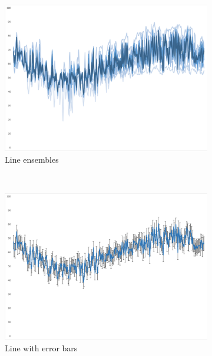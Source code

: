 \begin{figure}[t!]
	\centering
	\begin{subfigure}[t]{.3\columnwidth}
		\centering
		\includegraphics[width=\columnwidth]{images/ensemble}
		\caption{Line ensembles}
	\end{subfigure}%
	~ 
	\begin{subfigure}[t]{.3\columnwidth}
		\centering
		\includegraphics[width=\columnwidth]{images/errorbars}
		\caption{Line with error bars}
	\end{subfigure}
	~ 
	\begin{subfigure}[t]{.3\columnwidth}
		\centering

\end{subfigure}
\end{figure}
